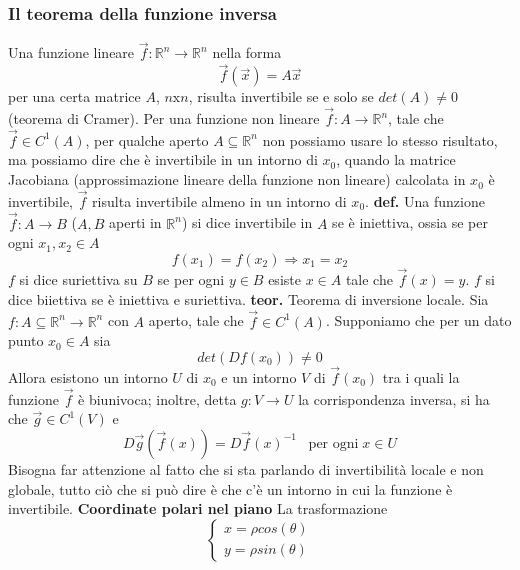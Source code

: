 \subsubsection{Il teorema della funzione inversa}
Una funzione lineare $\vec{f}: \mathbb{R}^n \rightarrow \mathbb{R}^n$ nella forma
\[
    \vec{f}(\vec{x}) =A \vec{x}
\]
per una certa matrice $A$, $n \text{x} n$, risulta invertibile se e solo se $det(A)\neq 0$ (teorema di Cramer).\newline
\newline
Per una funzione non lineare $\vec{f}: A \rightarrow \mathbb{R}^n$, tale che $\vec{f}\in C^1(A)$, per qualche aperto $A \subseteq \mathbb{R}^n$ non possiamo usare lo stesso risultato, ma possiamo dire che è invertibile in un intorno di $x_0$, quando la matrice Jacobiana (approssimazione lineare della funzione non lineare) calcolata in $x_0$ è invertibile, $\vec{f}$ risulta invertibile almeno in un intorno di $x_0$.\newline
\newline
\textbf{def.} Una funzione $\vec{f}: A \rightarrow B$ ($A,B$ aperti in $\mathbb{R}^n$) si dice invertibile in $A$ se è iniettiva, ossia se per ogni $x_1, x_2 \in A$
\[
    f(x_1) = f(x_2) \Rightarrow x_1 = x_2
\]
$f$ si dice suriettiva su $B$ se per ogni $y \in B$ esiste $x \in A$ tale che $\vec{f} (x) = y$.\newline
$f$ si dice biiettiva se è iniettiva e suriettiva.\newline
\newline
\textbf{teor.} Teorema di inversione locale. Sia $f: A \subseteq \mathbb{R}^n \rightarrow \mathbb{R}^n$ con $A$ aperto, tale che $\vec{f} \in C^1(A)$. Supponiamo che per un dato punto $x_0 \in A$ sia
\[
    det(Df(x_0)) \neq 0
\]
Allora esistono un intorno $U$ di $x_0$ e un intorno $V$ di $\vec{f}(x_0)$ tra i quali  la funzione $\vec{f}$ è biunivoca; inoltre, detta $g: V \rightarrow U$ la corrispondenza inversa, si ha che $\vec{g}\in C^1(V)$ e 
\[
    D \vec{g}(\vec{f}(x)) = D \vec{f}(x)^{-1} \;\;\; \text{per ogni} \;x \in U
\]
Bisogna far attenzione al fatto che si sta parlando di invertibilità locale e non globale, tutto ciò che si può dire è che c'è un intorno in cui la funzione è invertibile.\newline
\newline
\textbf{Coordinate polari nel piano}\newline
La trasformazione
\[
    \begin{cases}
        x = \rho cos(\theta)\\
        y = \rho sin(\theta)
    \end{cases}
\]
